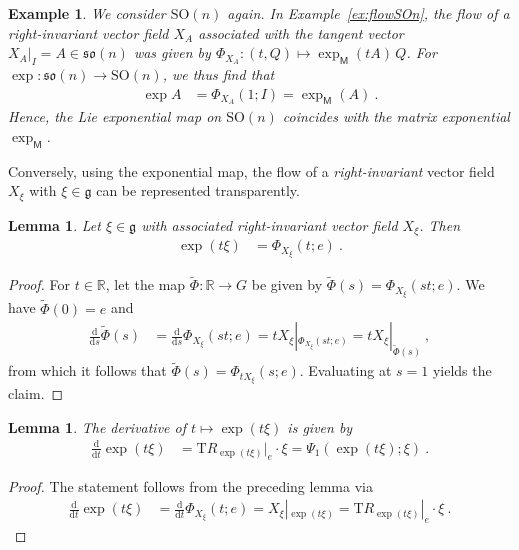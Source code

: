 \documentclass[10pt,a4paper]{article}
\theoremstyle{mytheorem}
\newtheorem{lemma}[theorem]{Lemma}
\theoremstyle{mydefinition}
\newtheorem{example}[theorem]{Example}
\newcommand{\dt}{\mathrm{d}}
\newcommand{\Tt}{\mathrm{T}}
\newcommand{\SO}{\mathrm{SO}}
\newcommand{\fso}{\mathfrak{so}}
\newcommand{\fg}{\mathfrak{g}}
\begin{document}
\begin{example}
We consider $\SO(n)$ again.
In Example~\ref{ex:flowSOn}, the flow of a right-invariant vector field $X_A$ associated with the tangent vector $X_A|_I=A\in\fso(n)$ was given by $\Phi_{X_A}:(t,Q)\mapsto\exp_\mathsf{M}(tA)\,Q$.
For $\exp:\fso(n)\rightarrow\SO(n)$, we thus find that
\begin{align*}
	\exp A &= \Phi_{X_A}(1; I) = \exp_\mathsf{M}(A)
	\ .
\end{align*}
Hence, the Lie exponential map on $\SO(n)$ coincides with the matrix exponential $\exp_\mathsf{M}$.
\end{example}

Conversely, using the exponential map, the flow of a \emph{right-invariant} vector field $X_\xi$ with $\xi\in\mathfrak{g}$ can be represented transparently.

\begin{lemma}
Let $\xi\in\fg$ with associated right-invariant vector field $X_\xi$.
Then
\begin{align*}
	\exp(t\xi) &= \Phi_{X_\xi}(t; e)
	\ .
\end{align*}
\end{lemma}
\begin{proof}
For $t\in\mathbb{R}$, let the map $\tilde{\Phi}:\mathbb{R}\rightarrow G$ be given by $\tilde{\Phi}(s)=\Phi_{X_\xi}(st; e)$.
We have $\tilde{\Phi}(0)=e$ and
\begin{align*}
	\frac{\dt}{\dt s}	
	\tilde{\Phi}(s)
	&=
	\frac{\dt}{\dt s}
	\Phi_{X_\xi}(st; e)
	= tX_\xi|_{\Phi_{X_\xi}(st; e)} = tX_\xi|_{\tilde{\Phi}(s)}
	\ ,
\end{align*}
from which it follows that $\tilde{\Phi}(s)=\Phi_{tX_\xi}(s; e)$.
Evaluating at $s=1$ yields the claim.
\end{proof}

\begin{lemma}
The derivative of $t\mapsto\exp(t\xi)$ is given by
\begin{align*}
	\frac{\dt}{\dt t}\exp(t\xi)
	&=
	\Tt R_{\exp(t\xi)}|_e\cdot\xi
	=
	\Psi_1(\exp(t\xi); \xi)
	\ .
\end{align*}
\end{lemma}
\begin{proof}
The statement follows from the preceding lemma via
\begin{align*}
	\frac{\dt}{\dt t}\exp(t\xi)
	&= 
	\frac{\dt}{\dt t}
	\Phi_{X_\xi}(t;e)
	= X_\xi|_{\exp(t\xi)}
	= \Tt R_{\exp(t\xi)}|_e\cdot\xi
	\ .
\end{align*}
\end{proof}
\end{document}
